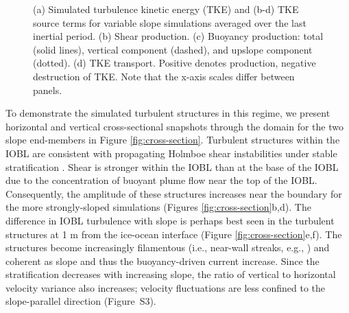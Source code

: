 \documentclass[draft]{styles/agujournal2019}
\begin{document}
\begin{figure}
\begin{minipage}{0.33\textwidth}
    \end{minipage}
    \caption{(a) Simulated turbulence kinetic energy (TKE) and (b-d) TKE source terms for variable slope simulations averaged over the last inertial period. (b) Shear production. (c) Buoyancy production: total (solid lines), vertical component (dashed), and upslope component (dotted). (d) TKE transport. Positive denotes production, negative destruction of TKE. Note that the x-axis scales differ between panels.}
    \label{fig:tke_budget}
\end{figure}

To demonstrate the simulated turbulent structures in this regime, we present horizontal and vertical cross-sectional  snapshots through the domain for the two slope end-members in Figure \ref{fig:cross-section}. Turbulent structures within the IOBL are consistent with propagating Holmboe shear instabilities under stable stratification \cite{carpenter_identifying_2010}. Shear is stronger within the IOBL than at the base of the IOBL due to the concentration of buoyant plume flow near the top of the IOBL. Consequently, the amplitude of these structures increases near the boundary for the more strongly-sloped simulations (Figures \ref{fig:cross-section}b,d). The difference in IOBL turbulence with slope is perhaps best seen in the turbulent structures at 1 m from the ice-ocean interface (Figure \ref{fig:cross-section}e,f). The structures become increasingly filamentous (i.e., near-wall streaks, e.g., ) and coherent as slope and thus the buoyancy-driven current increase. Since the stratification decreases with increasing slope, the ratio of vertical to horizontal velocity variance also increases; velocity fluctuations are less confined to the slope-parallel direction (Figure~S3).
\end{document}
